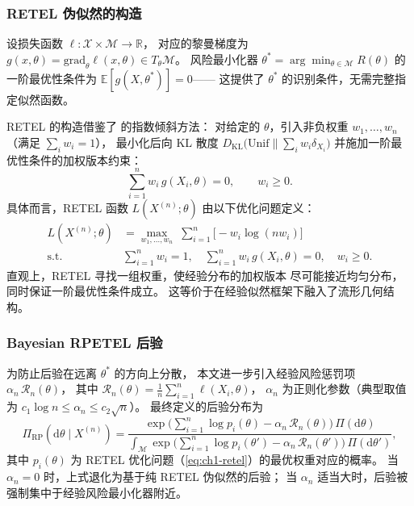 \subsubsection{RETEL 伪似然的构造}\label{sec:ch1-retel}

设损失函数 $\ell:\mathcal{X}\times\mathcal{M}\to\mathbb{R}$，
对应的黎曼梯度为 $g(x,\theta)=\mathrm{grad}_\theta\ell(x,\theta)\in T_\theta\mathcal{M}$。
风险最小化器 $\theta^*=\arg\min_{\theta\in\mathcal{M}}R(\theta)$
的一阶最优性条件为 $\mathbb{E}[g(X,\theta^*)]=0$——
这提供了 $\theta^*$ 的识别条件，无需完整指定似然函数。

RETEL 的构造借鉴了 \citep{schennach2005bayesian} 的指数倾斜方法：
对给定的 $\theta$，引入非负权重 $w_1,\ldots,w_n$（满足 $\sum_i w_i=1$），
最小化后向 KL 散度 $D_{\mathrm{KL}}\big(\mathrm{Unif}\|\sum_i w_i\delta_{X_i}\big)$
并施加一阶最优性条件的加权版本约束：
\[
\sum_{i=1}^n w_i\,g(X_i,\theta)=0,\qquad w_i\ge 0.
\]
具体而言，RETEL 函数 $L(X^{(n)};\theta)$ 由以下优化问题定义：
\begin{equation}\label{eq:ch1-retel}
\begin{aligned}
L(X^{(n)};\theta)
&= \max_{w_1,\ldots,w_n}\;
\sum_{i=1}^n \big[-w_i\log(nw_i)\big] \\
\text{s.t.}\;&\sum_{i=1}^n w_i=1,\quad
\sum_{i=1}^n w_i\,g(X_i,\theta)=0,\quad
w_i\ge 0.
\end{aligned}
\end{equation}
直观上，RETEL 寻找一组权重，使经验分布的加权版本
尽可能接近均匀分布，同时保证一阶最优性条件成立。
这等价于在经验似然框架下融入了流形几何结构。

\subsubsection{Bayesian RPETEL 后验}\label{sec:ch1-rpetel-posterior}

为防止后验在远离 $\theta^*$ 的方向上分散，
本文进一步引入经验风险惩罚项 $\alpha_n\,\mathcal{R}_n(\theta)$，
其中 $\mathcal{R}_n(\theta)=\frac{1}{n}\sum_{i=1}^n\ell(X_i,\theta)$，
$\alpha_n$ 为正则化参数（典型取值为 $c_1\log n\le\alpha_n\le c_2\sqrt{n}$）。
最终定义的后验分布为
\begin{equation}\label{eq:ch1-rpetel-posterior}
\Pi_{\mathrm{RP}}(\mathrm{d}\theta\mid X^{(n)})
= \frac{\exp\!\Big(\sum_{i=1}^n\log p_i(\theta)
            -\alpha_n\,\mathcal{R}_n(\theta)\Big)\,
      \Pi(\mathrm{d}\theta)}
      {\int_{\mathcal{M}}
       \exp\!\Big(\sum_{i=1}^n\log p_i(\theta')
                  -\alpha_n\,\mathcal{R}_n(\theta')\Big)\,
       \Pi(\mathrm{d}\theta')},
\end{equation}
其中 $p_i(\theta)$ 为 RETEL 优化问题（\cref{eq:ch1-retel}）的最优权重对应的概率。
当 $\alpha_n=0$ 时，上式退化为基于纯 RETEL 伪似然的后验；
当 $\alpha_n$ 适当大时，后验被强制集中于经验风险最小化器附近。

